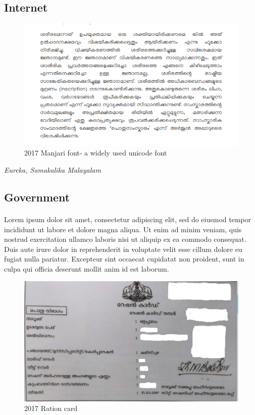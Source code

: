 \documentclass[10pt]{article}
\begin{document}
\subsection{Internet}
\begin{figure}
 \centering
  \includegraphics[width=1.0\textwidth]{images/Manjari-Body-Text.png}
   \caption{2017 Manjari font- a widely used unicode font}
\end{figure}


\textit{Eureka, Samakalika Malayalam}

\subsection{Government}
\paragraph{}

Lorem ipsum dolor sit amet, consectetur adipiscing elit, sed do eiusmod tempor incididunt ut labore et dolore magna aliqua. Ut enim ad minim veniam, quis nostrud exercitation ullamco laboris nisi ut aliquip ex ea commodo consequat. Duis aute irure dolor in reprehenderit in voluptate velit esse cillum dolore eu fugiat nulla pariatur. Excepteur sint occaecat cupidatat non proident, sunt in culpa qui officia deserunt mollit anim id est laborum.


\begin{figure}[h!]
 \centering
  \includegraphics[width=1.0\textwidth]{images/2017-rationcard.jpg}
   \caption{2017 Ration card}
\end{figure}
\end{document}
